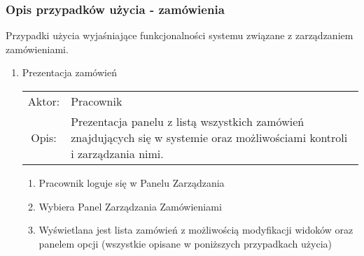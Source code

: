 \subsubsection{Opis przypadków użycia - zamówienia}

Przypadki użycia wyjaśniające funkcjonalności systemu związane z zarządzaniem
zamówieniami.

\begin{enumerate}
  \item Prezentacja zamówień\\
  \begin{tabularx}{\linewidth}{ c X }
  Aktor: & Pracownik \\
  Opis: & Prezentacja panelu z listą wszystkich zamówień znajdujących się w
  systemie oraz możliwościami kontroli i zarządzania nimi.\\
  \end{tabularx}
	\begin{enumerate}
	  \item Pracownik loguje się w Panelu Zarządzania
	  \item Wybiera Panel Zarządzania Zamówieniami
	  \item Wyświetlana jest lista zamówień z możliwością modyfikacji widoków
	  oraz panelem opcji (wszystkie opisane w poniższych przypadkach użycia)
	\end{enumerate}


\end{enumerate}
